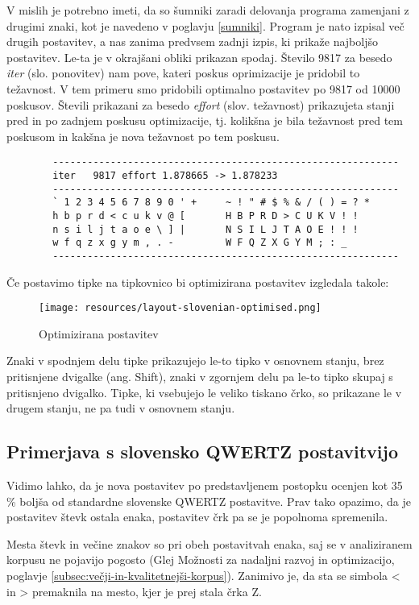     V mislih je potrebno imeti, da so šumniki zaradi delovanja programa zamenjani z drugimi znaki, kot je navedeno v poglavju \ref{sumniki}.
    Program je nato izpisal več drugih postavitev, a nas zanima predvsem zadnji izpis, ki prikaže najboljšo postavitev.
    Le-ta je v okrajšani obliki prikazan spodaj. Število 9817 za besedo \emph{iter} (slo. ponovitev) nam pove,
    kateri poskus oprimizacije je pridobil to težavnost.
    V tem primeru smo pridobili optimalno postavitev po 9817 od 10000 poskusov.
    Števili prikazani za besedo \emph{effort} (slov. težavnost) prikazujeta stanji pred in po zadnjem poskusu optimizacije,
    tj. kolikšna je bila težavnost pred tem poskusom in kakšna je nova težavnost po tem poskusu.

    \begin{verbatim}
        ------------------------------------------------------------
        iter   9817 effort 1.878665 -> 1.878233
        ------------------------------------------------------------
        ` 1 2 3 4 5 6 7 8 9 0 ' +     ~ ! " # $ % & / ( ) = ? *
        h b p r d < c u k v @ [       H B P R D > C U K V ! !
        n s i l j t a o e \ ] |       N S I L J T A O E ! ! !
        w f q z x g y m , . -         W F Q Z X G Y M ; : _
        ------------------------------------------------------------
    \end{verbatim}

        Če postavimo tipke na tipkovnico bi optimizirana postavitev izgledala takole:

        \begin{figure}[h]
        \centering
        \texttt{[image: resources/layout-slovenian-optimised.png]}
        \caption{Optimizirana postavitev}
        \end{figure}

        Znaki v spodnjem delu tipke prikazujejo le-to tipko v osnovnem stanju, brez pritisnjene dvigalke (ang. Shift),
        znaki v zgornjem delu pa le-to tipko skupaj s pritisnjeno dvigalko.
        Tipke, ki vsebujejo le veliko tiskano črko, so prikazane le v drugem stanju, ne pa tudi v osnovnem stanju.

    \subsection{Primerjava s slovensko QWERTZ postavitvijo}\label{subsec:primerjava-s-slovensko-qwertz-postavitvijo}

    Vidimo lahko, da je nova postavitev po predstavljenem postopku ocenjen kot 35 \% boljša od standardne slovenske QWERTZ postavitve.
    Prav tako opazimo, da je postavitev števk ostala enaka, postavitev črk pa se je popolnoma spremenila.

    Mesta števk in večine znakov so pri obeh postavitvah enaka,
    saj se v analiziranem korpusu ne pojavijo pogosto (Glej Možnosti za nadaljni razvoj in optimizacijo, poglavje \ref{subsec:večji-in-kvalitetnejši-korpus}).
    Zanimivo je, da sta se simbola < in > premaknila na mesto, kjer je prej stala črka Z\@.

